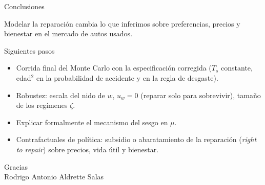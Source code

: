 \documentclass[aspectratio=169,11pt]{beamer}
\newcommand{\idea}[1]{\vspace{-0.3em}\begin{block}{}\centering\small #1\end{block}}
\begin{document}
\begin{frame}{Conclusiones}
  \vspace{0.5em}
  \centering
  \vspace{0.8em}
  \idea{Modelar la reparación cambia lo que inferimos sobre preferencias, precios y
  bienestar en el mercado de autos usados.}
\end{frame}

\begin{frame}{Siguientes pasos}
  \begin{itemize}
    \item Corrida final del Monte Carlo con la especificación corregida ($T_s$ constante,
          edad$^2$ en la probabilidad de accidente y en la regla de desgaste).
    \item Robustez: escala del nido de $w$, $u_w=0$ (reparar solo para sobrevivir),
          tamaño de los regímenes $\zeta$.
    \item Explicar formalmente el mecanismo del sesgo en $\mu$.
    \item Contrafactuales de política: subsidio o abaratamiento de la reparación
          (\emph{right to repair}) sobre precios, vida útil y bienestar.
  \end{itemize}
\end{frame}

\begin{frame}
  \centering\Large Gracias\\[1em]
  \normalsize Rodrigo Antonio Aldrette Salas
\end{frame}

\appendix
\end{document}
